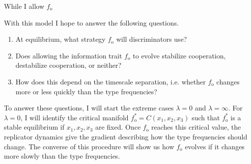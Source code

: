 \documentclass{article}
\begin{document}
While I allow $f_\text{o}$  

With this  model  I hope to answer the following questions.

\begin{enumerate}
\item At equilibrium, what strategy $f_\text{o}$ will discriminators use?
\item Does allowing the information trait $f_\text{o}$ to evolve stabilize cooperation, destabilize cooperation, or neither?
\item How does this depend on the timescale separation, i.e. whether $f_\text{o}$ changes more or less quickly than the type frequencies?
\end{enumerate}

To answer these questions, I will start the extreme cases $\lambda=0$ and $\lambda=\infty$.  For $\lambda=0$, I will identify the critical manifold $f_\text{o}^*=C(x_1,x_2,x_3)$ such that $f_\text{o}^*$ is a stable equilibrium if $x_1,x_2,x_3$ are fixed. Once $f_\text{o}$ reaches this critical value, the replicator dynamics give the gradient describing how the type frequencies should change. The converse of this procedure will show us how $f_\text{o}$ evolves if it changes more slowly than the type frequencies.
\end{document}
